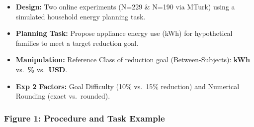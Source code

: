 \documentclass[
  12pt,
]{article}
\providecommand{\tightlist}{%
  \setlength{\itemsep}{0pt}\setlength{\parskip}{0pt}}
\begin{document}
\begin{multicols}{3}
\begin{itemize}
\tightlist
\item
  \textbf{Design:} Two online experiments (N=229 \& N=190 via MTurk)
  using a simulated household energy planning task.
\item
  \textbf{Planning Task:} Propose appliance energy use (kWh) for
  hypothetical families to meet a target reduction goal.
\item
  \textbf{Manipulation:} Reference Class of reduction goal
  (Between-Subjects): \textbf{kWh} vs.~\textbf{\%} vs.~\textbf{USD}.
\item
  \textbf{Exp 2 Factors:} Goal Difficulty (10\% vs.~15\% reduction) and
  Numerical Rounding (exact vs.~rounded).
\end{itemize}

\subsubsection{Figure 1: Procedure and Task
Example}\label{figure-1-procedure-and-task-example}

\begin{figure}[H]
\centering


\end{figure}
\end{multicols}
\end{document}
